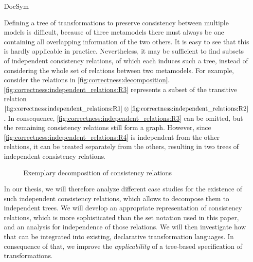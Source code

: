 \begin{copiedFrom}{DocSym}

Defining a tree of transformations to preserve consistency between multiple models is difficult, because of three metamodels there must always be one containing all overlapping information of the two others.
It is easy to see that this is hardly applicable in practice.
Nevertheless, it may be sufficient to find subsets of independent consistency relations, of which each induces such a tree, instead of considering the whole set of relations between two metamodels.
For example, consider the relations in \autoref{fig:correctness:decomposition}.
\ref{fig:correctness:independent_relations:R3} represents a subset of the transitive relation $\mbox{\ref{fig:correctness:independent_relations:R1}} \otimes \mbox{\ref{fig:correctness:independent_relations:R2}}$.
In consequence, \ref{fig:correctness:independent_relations:R3} can be omitted, but the remaining consistency relations still form a graph.
However, since \ref{fig:correctness:independent_relations:R4} is independent from the other relations, it can be treated separately from the others, resulting in two trees of independent consistency relations.

\begin{figure}
    \centering
    
    \caption{Exemplary decomposition of consistency relations}
    \label{fig:correctness:decomposition}
\end{figure}

In our thesis, we will therefore analyze different case studies for the existence of such independent consistency relations, which allows to decompose them to independent trees.
We will develop an appropriate representation of consistency relations, which is more sophisticated than the set notation used in this paper, and an analysis for independence of those relations.
We will then investigate how that can be integrated into existing, declarative transformation languages.
In consequence of that, we improve the \emph{applicability} of a tree-based specification of transformations.


\end{copiedFrom}
